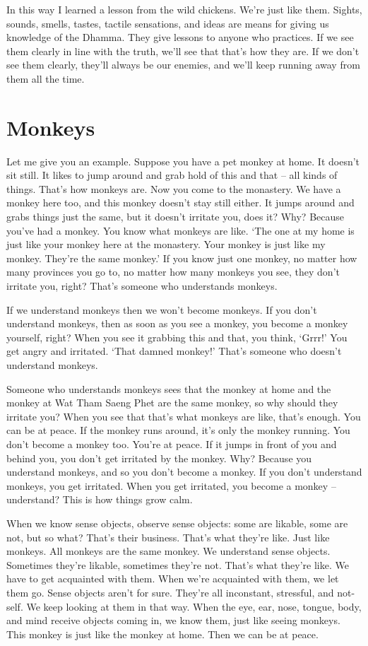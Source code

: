 In this way I learned a lesson from the wild chickens. We're just like them. Sights, sounds, smells, tastes, tactile sensations, and ideas are means for giving us knowledge of the Dhamma. They give lessons to anyone who practices. If we see them clearly in line with the truth, we'll see that that's how they are. If we don't see them clearly, they'll always be our enemies, and we'll keep running away from them all the time.

\clearpage

\section{Monkeys}

Let me give you an example. Suppose you have a pet monkey at home. It doesn't sit still. It likes to jump around and grab hold of this and that -- all kinds of things. That's how monkeys are. Now you come to the monastery. We have a monkey here too, and this monkey doesn't stay still either. It jumps around and grabs things just the same, but it doesn't irritate you, does it? Why? Because you've had a monkey. You know what monkeys are like. `The one at my home is just like your monkey here at the monastery. Your monkey is just like my monkey. They're the same monkey.' If you know just one monkey, no matter how many provinces you go to, no matter how many monkeys you see, they don't irritate you, right? That's someone who understands monkeys.

If we understand monkeys then we won't become monkeys. If you don't understand monkeys, then as soon as you see a monkey, you become a monkey yourself, right? When you see it grabbing this and that, you think, `Grrr!' You get angry and irritated. `That damned monkey!' That's someone who doesn't understand monkeys. 

Someone who understands monkeys sees that the monkey at home and the monkey at Wat Tham Saeng Phet are the same monkey, so why should they irritate you? When you see that that's what monkeys are like, that's enough. You can be at peace. If the monkey runs around, it's only the monkey running. You don't become a monkey too. You're at peace. If it jumps in front of you and behind you, you don't get irritated by the monkey. Why? Because you understand monkeys, and so you don't become a monkey. If you don't understand monkeys, you get irritated. When you get irritated, you become a monkey -- understand? This is how things grow calm.

When we know sense objects, observe sense objects: some are likable, some are not, but so what? That's their business. That's what they're like. Just like monkeys. All monkeys are the same monkey. We understand sense objects. Sometimes they're likable, sometimes they're not. That's what they're like. We have to get acquainted with them. When we're acquainted with them, we let them go. Sense objects aren't for sure. They're all inconstant, stressful, and not-self. We keep looking at them in that way. When the eye, ear, nose, tongue, body, and mind receive objects coming in, we know them, just like seeing monkeys. This monkey is just like the monkey at home. Then we can be at peace. 

